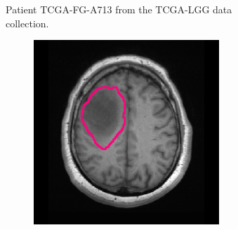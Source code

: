 \begin{subappendices}
\begin{figure}[htbp]
\begin{subfigure}[b]{0.95\textwidth}
\begin{subfigure}[b]{0.215\textwidth}
        \end{subfigure}
        \caption{Patient TCGA-FG-A713 from the TCGA-LGG data collection.}
    \end{subfigure}
    \begin{subfigure}[b]{0.95\textwidth}
        \centering
        \hfill
        \begin{subfigure}[b]{0.215\textwidth}
        \includegraphics[width=\textwidth, clip, trim=2.5cm 0.5cm 2.5cm 0.5cm]{Figures/Random_segs/T1_TCGA-HT-7475.png}
        \end{subfigure}
        \hfill
        \begin{subfigure}[b]{0.215\textwidth}

\end{subfigure}
\end{subfigure}
\end{figure}
\end{subappendices}

